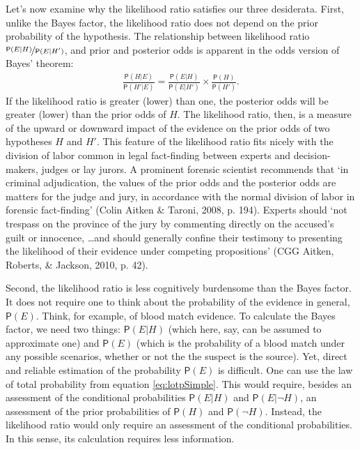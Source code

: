 \documentclass[
  10pt,
  dvipsnames,enabledeprecatedfontcommands]{scrartcl}
\newcommand{\pr}[1]{\mathsf{P}(#1)}
\begin{document}
Let's now examine why the likelihood ratio satisfies our three
desiderata. First, unlike the Bayes factor, the likelihood ratio does
not depend on the prior probability of the hypothesis. The relationship
between likelihood ratio \(\nicefrac{\pr{E \vert H}}{\pr{E \vert H'}}\),
and prior and posterior odds is apparent in the odds version of Bayes'
theorem: \begin{align}\label{eq:BTodds}
\frac{\pr{H \vert E}}{\pr{H' \vert E}}= \frac{\pr{E \vert H}}{\pr{E \vert H'}}\times \frac{\pr{H}}{\pr{H'}}.
\end{align} \noindent If the likelihood ratio is greater (lower) than
one, the posterior odds will be greater (lower) than the prior odds of
\(H\). The likelihood ratio, then, is a measure of the upward or
downward impact of the evidence on the prior odds of two hypotheses
\(H\) and \(H'\). This feature of the likelihood ratio fits nicely with
the division of labor common in legal fact-finding between experts and
decision-makers, judges or lay jurors. A prominent forensic scientist
recommends that `in criminal adjudication, the values of the prior odds
and the posterior odds are matters for the judge and jury, in accordance
with the normal division of labor in forensic fact-finding' (Colin
Aitken \& Taroni, 2008, p. 194). Experts should `not trespass on the
province of the jury by commenting directly on the accused's guilt or
innocence, \dots and should generally confine their testimony to
presenting the likelihood of their evidence under competing
propositions' (CGG Aitken, Roberts, \& Jackson, 2010, p. 42).

Second, the likelihood ratio is less cognitively burdensome than the
Bayes factor. It does not require one to think about the probability of
the evidence in general, \(\pr{E}\). Think, for example, of blood match
evidence. To calculate the Bayes factor, we need two things:
\(\pr{E\vert H}\) (which here, say, can be assumed to approximate one)
and \(\pr{E}\) (which is the probability of a blood match under any
possible scenarios, whether or not the the suspect is the source). Yet,
direct and reliable estimation of the probability \(\pr{E}\) is
difficult. One can use the law of total probability from equation
\eqref{eq:lotpSimple}. This would require, besides an assessment of the
conditional probabilities \(\pr{E\vert H}\) and \(\pr{E\vert \neg H}\),
an assessment of the prior probabilities of \(\pr{H}\) and
\(\pr{\neg H}\). Instead, the likelihood ratio would only require an
assessment of the conditional probabilities. In this sense, its
calculation requires less information.
\end{document}
